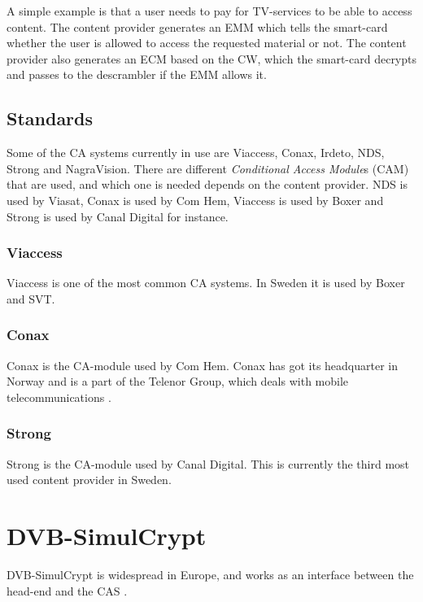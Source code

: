 
A simple example is that a user needs to pay for TV-services to be able to access
content. The content provider generates an EMM which tells the smart-card whether
the user is allowed to access the requested material or not. The content provider
also generates an ECM based on the CW, which the smart-card decrypts and passes 
to the descrambler if the EMM allows it.

\subsection{Standards}
Some of the CA systems currently in use are Viaccess, Conax, Irdeto, NDS, Strong 
and NagraVision. There are different \emph{Conditional Access Module}s (CAM) 
that are used, and which one is needed depends on the content provider. NDS is 
used by Viasat, Conax is used by Com Hem, Viaccess is used by Boxer and Strong 
is used by Canal Digital for instance.

\subsubsection{Viaccess}
Viaccess is one of the most common CA systems. In Sweden it is used by Boxer and SVT.

\subsubsection{Conax}
Conax is the CA-module used by Com Hem. Conax has got its headquarter in Norway and is a part of the Telenor Group, which deals with mobile telecommunications \citep{Conax}.

\subsubsection{Strong}
Strong is the CA-module used by Canal Digital. This is currently the third most 
used content provider in Sweden.

\section{DVB-SimulCrypt} \label{sec:Simul}
DVB-SimulCrypt is widespread in Europe, and works as an interface between the 
head-end and the CAS \citep{SimulCrypt:2008}.

